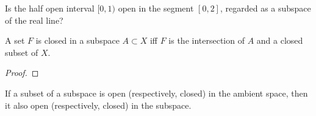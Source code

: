 \begin{minorEx}%
Is the half open interval $[0, 1)$ open in the segment $[0, 2]$, regarded as a subspace of the real line?
\end{minorEx}

\begin{majorEx}%
A set $F$ is closed in a subspace $A \subset X$ iff $F$ is the intersection of $A$ and a closed subset of $X$.
\end{majorEx}
\begin{proof}
\end{proof}

\begin{minorEx}%
If a subset of a subspace is open (respectively, closed) in the ambient space, then it also open (respectively, closed) in the subspace.
\end{minorEx}



